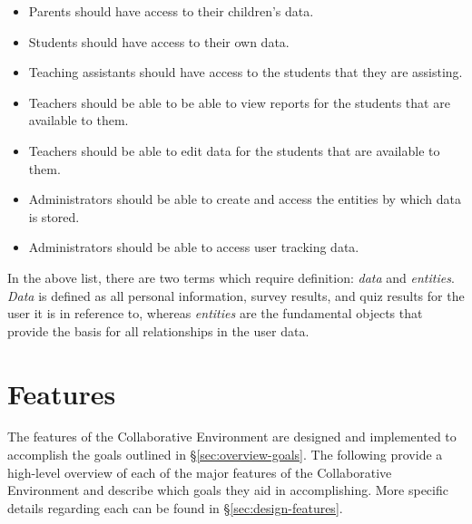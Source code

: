 \begin{itemize}
\item Parents should have access to their children's data.
\item Students should have access to their own data.
\item Teaching assistants should have access to the students that they are assisting.
\item Teachers should be able to be able to view reports for the students that are available to them.
\item Teachers should be able to edit data for the students that are available to them.
\item Administrators should be able to create and access the entities by which data is stored.
\item Administrators should be able to access user tracking data.
\end{itemize}

In the above list, there are two terms which require definition: \emph{data} and \emph{entities}. \emph{Data} is defined as all personal information, survey results, and quiz results for the user it is in reference to, whereas \emph{entities} are the fundamental objects that provide the basis for all relationships in the user data.


\section{Features}
\label{sec:overview-features}
The features of the Collaborative Environment are designed and implemented to accomplish the goals outlined in \S \ref{sec:overview-goals}. The following provide a high-level overview of each of the major features of the Collaborative Environment and describe which goals they aid in accomplishing. More specific details regarding each can be found in \S \ref{sec:design-features}.

